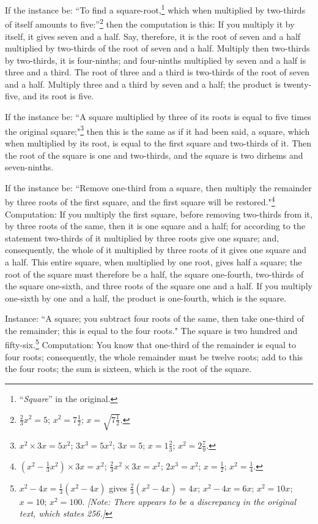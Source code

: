 If the instance be: ``To find a square-root,\footnote{``\textit{Square}'' in the original.} which when multiplied by two-thirds of itself amounts to five:''\footnote{$\frac{2}{3}x^2 = 5$; $x^2 = 7\frac{1}{2}$; $x = \sqrt{7\frac{1}{2}}$.} then the computation is this: If you multiply it by itself, it gives seven and a half. Say, therefore, it is the root of seven and a half multiplied by two-thirds of the root of seven and a half. Multiply then two-thirds by two-thirds, it is four-ninths; and four-ninths multiplied by seven and a half is three and a third. The root of three and a third is two-thirds of the root of seven and a half. Multiply three and a third by seven and a half; the product is twenty-five, and its root is five.

If the instance be: ``A square multiplied by three of its roots is equal to five times the original square;"\footnote{$x^2 \times 3x = 5x^2$; $3x^3 = 5x^2$; $3x = 5$; $x = 1\frac{2}{3}$; $x^2 = 2\frac{7}{9}$.} then this is the same as if it had been said, a square, which when multiplied by its root, is equal to the first square and two-thirds of it. Then the root of the square is one and two-thirds, and the square is two dirhems and seven-ninths.

If the instance be: ``Remove one-third from a square, then multiply the remainder by three roots of the first square, and the first square will be restored."\footnote{$(x^2 - \frac{1}{3}x^2) \times 3x = x^2$; $\frac{2}{3}x^2 \times 3x = x^2$; $2x^3 = x^2$; $x = \frac{1}{2}$; $x^2 = \frac{1}{4}$.} Computation: If you multiply the first square, before removing two-thirds from it, by three roots of the same, then it is one square and a half; for according to the statement two-thirds of it multiplied by three roots give one square; and, consequently, the whole of it multiplied by three roots of it gives one square and a half. This entire square, when multiplied by one root, gives half a square; the root of the square must therefore be a half, the square one-fourth, two-thirds of the square one-sixth, and three roots of the square one and a half. If you multiply one-sixth by one and a half, the product is one-fourth, which is the square.

Instance: ``A square; you subtract four roots of the same, then take one-third of the remainder; this is equal to the four roots." The square is two hundred and fifty-six.\footnote{$x^2 - 4x = \frac{1}{3}(x^2 - 4x)$ gives $\frac{2}{3}(x^2 - 4x) = 4x$; $x^2 - 4x = 6x$; $x^2 = 10x$; $x = 10$; $x^2 = 100$. \textit{[Note: There appears to be a discrepancy in the original text, which states 256.]}} Computation: You know that one-third of the remainder is equal to four roots; consequently, the whole remainder must be twelve roots; add to this the four roots; the sum is sixteen, which is the root of the square.


